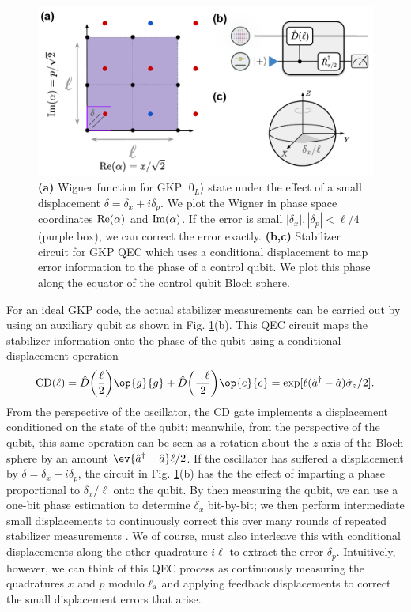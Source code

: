 \begin{figure}[h]
    \centering
    \includegraphics[width=0.85\linewidth]{Figures/2/GKP Ideal QEC.pdf}
    \caption{\textbf{(a)} Wigner function for GKP $|0_L\rangle$ state under the effect of a small displacement $\delta = \delta_x + i\delta_p$. We plot the Wigner in phase space coordinates ${\rm Re}(\alpha)$ and ${\rm Im}(\alpha)$. If the error is small $|\delta_x|, |\delta_p| < \ell / 4$ (purple box), we can correct the error exactly. \textbf{(b,c)} Stabilizer circuit for GKP QEC which uses a conditional displacement to map error information to the phase of a control qubit. We plot this phase along the equator of the control qubit Bloch sphere.}
    \label{fig:2-GKP-Ideal-QEC}
\end{figure}

For an ideal GKP code, the actual stabilizer measurements can be carried out by using an auxiliary qubit as shown in Fig. \ref{fig:2-GKP-Ideal-QEC}(b). This QEC circuit maps the stabilizer information onto the phase of the qubit using a conditional displacement operation
\begin{equation}
    {\rm CD}(\ell) = \hat{D}\bigg(\frac{\ell}{2}\bigg)\op{g}{g} + \hat{D}\bigg(\frac{-\ell}{2}\bigg)\op{e}{e} = \exp[\ell(\hat{a}^\dagger - \hat{a}) \sigmaz / 2].
    \label{eq:2_CD_unitary_definition}
\end{equation}
From the perspective of the oscillator, the CD gate implements a displacement conditioned on the state of the qubit; meanwhile, from the perspective of the qubit, this same operation can be seen as a rotation about the $z$-axis of the Bloch sphere by an amount $\ev{\hat{a}^\dagger - \hat{a}}\ell/2$. If the oscillator has suffered a displacement by $\delta = \delta_x + i\delta_p$, the circuit in Fig. \ref{fig:2-GKP-Ideal-QEC}(b) has the the effect of imparting a phase proportional to $\delta_x/\ell$ onto the qubit. By then measuring the qubit, we can use a one-bit phase estimation to determine $\delta_x$ bit-by-bit; we then perform intermediate small displacements to continuously correct this over many rounds of repeated stabilizer measurements \cite{terhal2016phase-estimation, terhal2020bosonic}. We of course, must also interleave this with conditional displacements along the other quadrature $i\ell$ to extract the error $\delta_p$. Intuitively, however, we can think of this QEC process as continuously measuring the quadratures $x$ and $p$ modulo $\ell_{\rm s}$ and applying feedback displacements to correct the small displacement errors that arise. 

